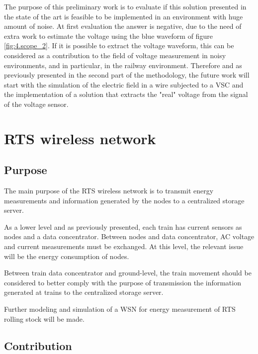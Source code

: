 	The purpose of this preliminary work is to evaluate if this solution presented in the state of the art is feasible to be implemented in an environment with huge amount of noise. At first evaluation the answer is negative, due to the need of extra work to estimate the voltage using the blue waveform of figure \ref{fig:4.scope_2}.
	If it is possible to extract the voltage waveform, this can be considered as a contribution to the field of voltage measurement in noisy environments, and in particular, in the railway environment.
	Therefore and as previously presented in the second part of the methodology, the future work will start with the simulation of the electric field in a wire subjected to a VSC and the implementation of a solution that extracts the "real" voltage from the signal of the voltage sensor.
	
	

\section{RTS wireless network}
\label{sec:43}

\subsection{Purpose}

The main purpose of the RTS wireless network is to transmit energy measurements and information generated by the nodes to a centralized storage server. 

As a lower level and as previously presented, each train has current sensors as nodes and a data concentrator. Between nodes and data concentrator, AC voltage and current measurements must be exchanged.
At this level, the relevant issue will be the energy consumption of nodes.

Between train data concentrator and ground-level, the train movement should be considered to better comply with the purpose of transmission the information generated at trains to the centralized storage server. 

Further modeling and simulation of a WSN for energy measurement of RTS rolling stock will be made.

\subsection{Contribution}

